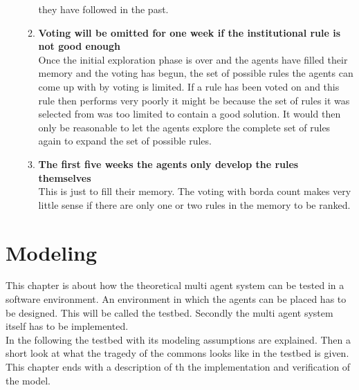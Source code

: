 \documentclass[a4paper]{article}
\begin{document}
\begin{enumerate}
\begin{enumerate}
                                         they have followed in the past. 
                                         \item \textbf{Voting will be omitted for one week if the institutional rule 
                                         is not good enough} \\
                                         Once the initial exploration phase is over and the agents have filled their memory 
                                         and the voting has begun, the set of possible rules the agents can come up with by 
                                         voting is limited.  If a rule has been voted on and this rule then performs very 
                                         poorly it might be because the set of rules it was selected from was too limited 
                                         to contain a good solution. It would then only be reasonable to let the agents 
                                         explore the complete set of rules again to expand the set of possible rules. 
                                         \item \textbf{The first five weeks the agents only develop the rules themselves }\\
                                         This is just  to fill their memory. The voting with borda count makes very little
                                         sense if there are only one or two rules in the memory to be ranked.




                                        \end{enumerate}


\end{enumerate}
\clearpage
\section{Modeling}
This chapter is about how the theoretical multi agent system can be tested in a software environment. An environment 
in which the agents can be placed has to be designed. This will be called the testbed. Secondly the multi agent 
system itself has to be implemented. \\
In the following the testbed with its modeling assumptions are explained. Then a short look at what the tragedy 
of the commons looks like in the testbed is given. This chapter ends with a description of th the implementation and 
verification of the model.
\end{document}
